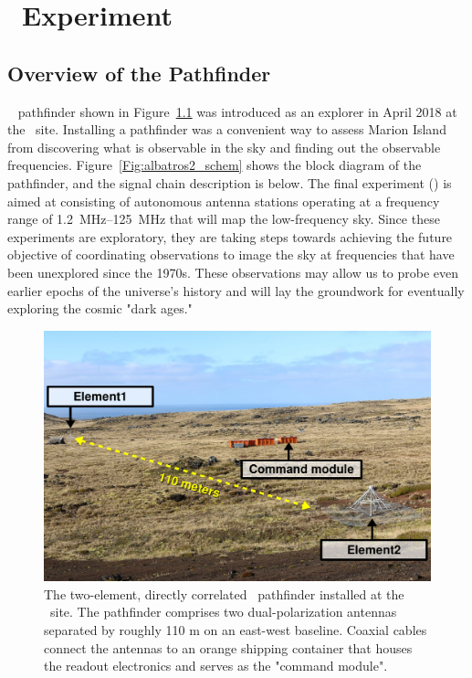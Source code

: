 \chapter{\albatros~Experiment}
\section{Overview of the Pathfinder}

\albatros~\citep[\albatros;][]{2020arXiv200812208C} pathfinder shown in Figure~\ref{Fig:albatros2} was introduced as an explorer in April 2018 at the \prizm\ site. Installing a pathfinder was a convenient way to assess Marion Island from discovering what is observable in the sky and finding out the observable frequencies. Figure~\ref{Fig:albatros2_schem} shows the block diagram of the pathfinder, and the signal chain description is below. The final experiment (\albatros) is aimed at consisting of autonomous antenna stations operating at a frequency range of \SIrange{1.2}{125}{\mega\hertz} that will map the low-frequency sky. Since these experiments are exploratory, they are taking steps towards achieving the future objective of coordinating observations to image the sky at frequencies that have been unexplored since the 1970s. These observations may allow us to probe even earlier epochs of the universe's history and will lay the groundwork for eventually exploring the cosmic "dark ages."

\begin{figure}
	\centering
	\includegraphics[width=\linewidth]{Figures/Albatros}
	\caption{The two-element, directly correlated \albatros\ pathfinder installed at the \prizm\ site. The pathfinder comprises two dual-polarization antennas separated by roughly 110 m on an east-west baseline. Coaxial cables connect the antennas to an orange shipping container that houses the readout electronics and serves as the "command module".}
	\label{Fig:albatros2}
\end{figure}

